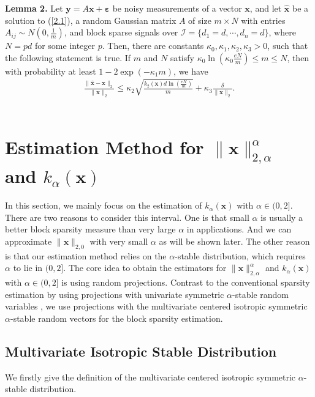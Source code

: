 \documentclass[journal,onecolumn]{IEEEtran}
\begin{document}
\noindent
{\bf Lemma 2.}  Let $\mathbf{y}=A\mathbf{x}+\boldsymbol{\varepsilon}$ be noisy measurements of a vector $\mathbf{x}$, and let $\widehat{\mathbf{x}}$ be a solution to (\ref{2.1}), a random Gaussian matrix $A$ of size $m\times N$ with entries $A_{ij}\sim N(0,\frac{1}{m})$, and block sparse signals over $\mathcal{I}=\{d_1=d,\cdots,d_n=d\}$, where $N=pd$ for some integer $p$. Then, there are constants $\kappa_0,\kappa_1,\kappa_2,\kappa_3>0$, such that the following statement is true. If $m$ and $N$ satisfy $\kappa_0\ln(\kappa_0\frac{eN}{m})\leq m\leq N$, then with probability at least $1-2\exp(-\kappa_1 m)$, we have \begin{align}
\frac{\lVert\widehat{\mathbf{x}}-\mathbf{x}\rVert_2}{\lVert\mathbf{x}\rVert_2}\leq \kappa_2\sqrt{\frac{k_2(\mathbf{x})d\ln(\frac{eN}{m})}{m}}+\kappa_3\frac{\delta}{\lVert\mathbf{x}\rVert_2}.
\end{align}\\

\section{Estimation Method for $\lVert\mathbf{x}\rVert_{2,\alpha}^{\alpha}$ and $k_{\alpha}(\mathbf{x})$}

In this section, we mainly focus on the estimation of $k_{\alpha}(\mathbf{x})$ with $\alpha\in(0,2]$. There are two reasons to consider this interval. One is that small $\alpha$ is usually a better block sparsity measure than very large $\alpha$ in applications. And we can approximate $\lVert \mathbf{x}\rVert_{2,0}$ with very small $\alpha$ as will be shown later. The other reason is that our estimation method relies on the $\alpha$-stable distribution, which requires $\alpha$ to lie in $(0,2]$. The core idea to obtain the estimators for $\lVert\mathbf{x}\rVert_{2,\alpha}^{\alpha}$ and $k_{\alpha}(\mathbf{x})$ with $\alpha\in(0,2]$ is using random projections. Contrast to the conventional sparsity estimation by using projections with univariate symmetric $\alpha$-stable random variables \cite{l2,z}, we use projections with the multivariate centered isotropic symmetric $\alpha$-stable random vectors \cite{n,p} for the block sparsity estimation.

\subsection{Multivariate Isotropic Stable Distribution}
 We firstly give the definition of the multivariate centered isotropic symmetric $\alpha$-stable distribution.\\
\end{document}
